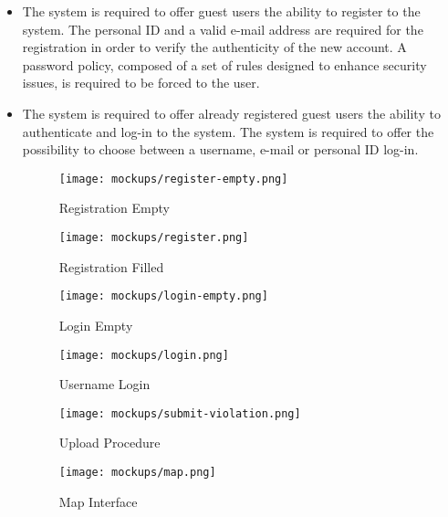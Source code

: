 	\begin{itemize}
		\item The system is required to offer guest users the ability to register to the system. The personal ID and a valid e-mail address are required for the registration in order to verify the authenticity of the new account. A password policy, composed of a set of rules designed to enhance security issues, is required to be forced to the user.
				
		\item The system is required to offer already registered guest users the ability to authenticate and log-in to the system. The system is required to offer the possibility to choose between a username, e-mail or personal ID log-in. \newline\newline
			
			\begin{figure}[h]
  				\centering
  				\begin{minipage}[b]{0.4\textwidth}
    				\texttt{[image: mockups/register-empty.png]}
    					\caption{Registration Empty}
  				\end{minipage}
  				\hfill
  				\begin{minipage}[b]{0.4\textwidth}
    				\texttt{[image: mockups/register.png]}
    				\caption{Registration Filled}
  				\end{minipage}
			\end{figure}
		
			\begin{figure}[h]
  				\centering
  				\begin{minipage}[b]{0.4\textwidth}
    				\texttt{[image: mockups/login-empty.png]}
    					\caption{Login Empty}
  				\end{minipage}
  				\hfill
  				\begin{minipage}[b]{0.4\textwidth}
    				\texttt{[image: mockups/login.png]}
    				\caption{Username Login}
  				\end{minipage}
			\end{figure}
			
			\begin{figure}[h]
  				\centering
  				\begin{minipage}[b]{0.4\textwidth}
    				\texttt{[image: mockups/submit-violation.png]}
    					\caption{Upload Procedure}
  				\end{minipage}
  				\hfill
  				\begin{minipage}[b]{0.4\textwidth}
    				\texttt{[image: mockups/map.png]}
    				\caption{Map Interface}
  				\end{minipage}
			\end{figure}
	\end{itemize}



